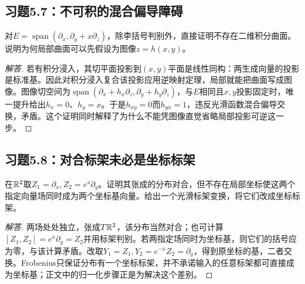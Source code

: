 \subsection*{习题5.7：不可积的混合偏导障碍}
对$E=\operatorname{span}(\partial_x,\partial_y+x\partial_z)$，除李括号判别外，直接证明不存在二维积分曲面。说明为何局部曲面可以先假设为图像$z=h(x,y)$。
\begin{proof}[解答]
若有积分浸入，其切平面投影到$(x,y)$平面是线性同构：两生成向量的投影是标准基。因此对积分浸入复合该投影应用逆映射定理，局部就能把曲面写成图像。图像切空间为$\operatorname{span}(\partial_x+h_x\partial_z,\partial_y+h_y\partial_z)$，与$E$相同且$x,y$投影固定时，唯一提升给出$h_x=0$、$h_y=x$。于是$h_{xy}=0$而$h_{yx}=1$，违反光滑函数混合偏导交换，矛盾。这个证明同时解释了为什么不能凭图像直觉省略局部投影可逆这一步。
\end{proof}

\subsection*{习题5.8：对合标架未必是坐标标架}
在$\mathbb{R}^2$取$Z_1=\partial_x,Z_2=e^x\partial_y$。证明其张成的分布对合，但不存在局部坐标使这两个指定向量场同时成为两个坐标基向量。给出一个光滑标架变换，将它们改成坐标标架。
\begin{proof}[解答]
两场处处独立，张成$T\mathbb{R}^2$，该分布当然对合；也可计算$[Z_1,Z_2]=e^x\partial_y=Z_2$并用标架判别。若两指定场同时为坐标基，则它们的括号应为零，与该计算矛盾。改取$Y_1=Z_1,Y_2=e^{-x}Z_2=\partial_y$，得到原坐标的基，二者交换。Frobenius只保证分布有一个坐标标架，并不承诺输入的任意标架都可直接成为坐标基；正文中的归一化步骤正是为解决这个差别。
\end{proof}
